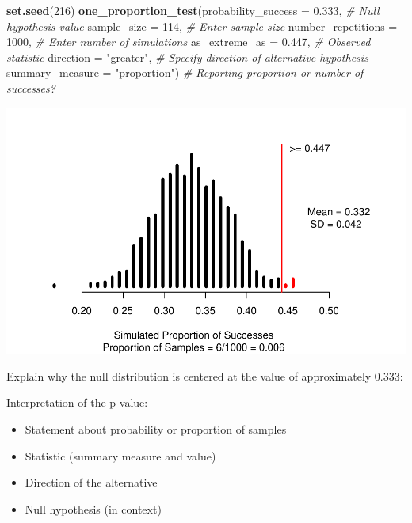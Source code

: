 \documentclass[
]{report}
\newenvironment{Shaded}{\begin{snugshade}}{\end{snugshade}}
\newcommand{\AttributeTok}[1]{\textcolor[rgb]{0.13,0.29,0.53}{#1}}
\newcommand{\CommentTok}[1]{\textcolor[rgb]{0.56,0.35,0.01}{\textit{#1}}}
\newcommand{\DecValTok}[1]{\textcolor[rgb]{0.00,0.00,0.81}{#1}}
\newcommand{\FloatTok}[1]{\textcolor[rgb]{0.00,0.00,0.81}{#1}}
\newcommand{\FunctionTok}[1]{\textcolor[rgb]{0.13,0.29,0.53}{\textbf{#1}}}
\newcommand{\NormalTok}[1]{#1}
\newcommand{\StringTok}[1]{\textcolor[rgb]{0.31,0.60,0.02}{#1}}
\begin{document}
\begin{Shaded}
\begin{Highlighting}[]
\FunctionTok{set.seed}\NormalTok{(}\DecValTok{216}\NormalTok{)}
\FunctionTok{one\_proportion\_test}\NormalTok{(}\AttributeTok{probability\_success =} \FloatTok{0.333}\NormalTok{, }\CommentTok{\# Null hypothesis value}
          \AttributeTok{sample\_size =} \DecValTok{114}\NormalTok{, }\CommentTok{\# Enter sample size}
          \AttributeTok{number\_repetitions =} \DecValTok{1000}\NormalTok{, }\CommentTok{\# Enter number of simulations}
          \AttributeTok{as\_extreme\_as =} \FloatTok{0.447}\NormalTok{, }\CommentTok{\# Observed statistic}
          \AttributeTok{direction =} \StringTok{"greater"}\NormalTok{, }\CommentTok{\# Specify direction of alternative hypothesis}
          \AttributeTok{summary\_measure =} \StringTok{"proportion"}\NormalTok{) }\CommentTok{\# Reporting proportion or number of successes?}
\end{Highlighting}
\end{Shaded}

\begin{center}\includegraphics[width=0.7\linewidth]{03-VN03-EDA_OneCatSimulation_files/figure-latex/unnamed-chunk-8-1} \end{center}

Explain why the null distribution is centered at the value of approximately 0.333:

\vspace{0.5in}

Interpretation of the p-value:

\begin{itemize}
\item
  Statement about probability or proportion of samples
\item
  Statistic (summary measure and value)
\item
  Direction of the alternative
\item
  Null hypothesis (in context)
\end{itemize}
\end{document}
